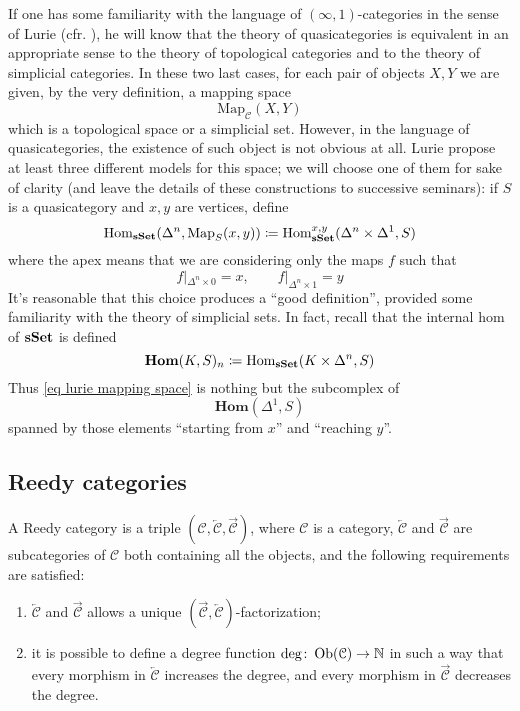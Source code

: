 \begin{refsection}
If one has some familiarity with the language of $(\infty,1)$-categories in the sense of Lurie (cfr. \cite{htt}), he will know that the theory of quasicategories is equivalent in an appropriate sense to the theory of topological categories and to the theory of simplicial categories. In these two last cases, for each pair of objects $X,Y$ we are given, by the very definition, a mapping space
\[
\mathrm{Map}_{\mathcal C}(X,Y)
\]
which is a topological space or a simplicial set. However, in the language of quasicategories, the existence of such object is not obvious at all. Lurie propose at least three different models for this space; we will choose one of them for sake of clarity (and leave the details of these constructions to successive seminars): if $S$ is a quasicategory and $x,y$ are vertices, define
\begin{equation} \label{eq lurie mapping space}
\mathrm{Hom}_{\mathbf{s\,\!\mathbf{Set}}}(\Delta^n, \mathrm{Map}_S(x,y))\coloneqq \mathrm{Hom}_{\mathbf{s\,\!\mathbf{Set}}}^{x,y}(\Delta^n \times \Delta^1, S)
\end{equation}
where the apex means that we are considering only the maps $f$ such that
\[
f |_{\Delta^n \times 0} = x, \qquad f |_{\Delta^n \times 1} = y
\]
It's reasonable that this choice produces a ``good definition'', provided some familiarity with the theory of simplicial sets. In fact, recall that the internal hom of $\mathbf{s\,\!\mathbf{Set}}$ is defined
\[
\mathbf{Hom}(K,S)_n\coloneqq \mathrm{Hom}_{\mathbf{s\,\!\mathbf{Set}}}(K \times \Delta^n, S)
\]
Thus \eqref{eq lurie mapping space} is nothing but the subcomplex of
\[
\mathbf{Hom}(\Delta^1,S)
\]
spanned by those elements ``starting from $x$'' and ``reaching $y$''.

\subsection{Reedy categories}

\begin{defin}
A Reedy category is a triple $\left(\mathcal C, \overleftarrow{\mathcal C}, \overrightarrow{\mathcal C}\right)$, where $\mathcal C$ is a category, $\overleftarrow{\mathcal C}$ and $\overrightarrow{\mathcal C}$ are subcategories of $\mathcal C$ both containing all the objects, and the following requirements are satisfied:
\begin{enumerate}
\item $\overleftarrow{\mathcal C}$ and $\overrightarrow{\mathcal C}$ allows a unique $\left(\overrightarrow{\mathcal C}, \overleftarrow{\mathcal C}\right)$-factorization;
\item it is possible to define a degree function $\deg \colon \operatorname{Ob}(\mathcal C) \to \mathbb{N}$ in such a way that every morphism in $\overleftarrow{\mathcal C}$ increases the degree, and every morphism in $\overrightarrow{\mathcal C}$ decreases the degree.
\end{enumerate}
\end{defin}


\end{refsection}
